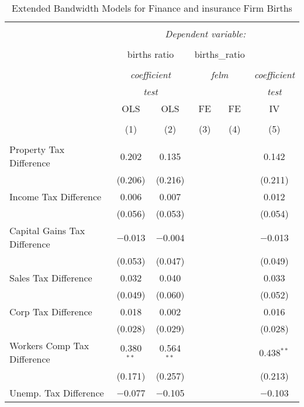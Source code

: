 
\begin{table}[!htbp] \centering 
  \caption{Extended Bandwidth Models for  Finance and insurance Firm Births} 
  \label{} 
\begin{tabular}{@{\extracolsep{5pt}}lccccc} 
\\[-1.8ex]\hline 
\hline \\[-1.8ex] 
 & \multicolumn{5}{c}{\textit{Dependent variable:}} \\ 
\cline{2-6} 
\\[-1.8ex] & \multicolumn{2}{c}{births ratio} & \multicolumn{2}{c}{births\_ratio} &   \\ 
\\[-1.8ex] & \multicolumn{2}{c}{\textit{coefficient}} & \multicolumn{2}{c}{\textit{felm}} & \textit{coefficient} \\ 
 & \multicolumn{2}{c}{\textit{test}} & \multicolumn{2}{c}{\textit{}} & \textit{test} \\ 
 & OLS & OLS & FE & FE & IV \\ 
\\[-1.8ex] & (1) & (2) & (3) & (4) & (5)\\ 
\hline \\[-1.8ex] 
 Property Tax Difference & 0.202 & 0.135 &  &  & 0.142 \\ 
  & (0.206) & (0.216) &  &  & (0.211) \\ 
  Income Tax Difference & 0.006 & 0.007 &  &  & 0.012 \\ 
  & (0.056) & (0.053) &  &  & (0.054) \\ 
  Capital Gains Tax Difference & $-$0.013 & $-$0.004 &  &  & $-$0.013 \\ 
  & (0.053) & (0.047) &  &  & (0.049) \\ 
  Sales Tax Difference & 0.032 & 0.040 &  &  & 0.033 \\ 
  & (0.049) & (0.060) &  &  & (0.052) \\ 
  Corp Tax Difference & 0.018 & 0.002 &  &  & 0.016 \\ 
  & (0.028) & (0.029) &  &  & (0.028) \\ 
  Workers Comp Tax Difference & 0.380$^{**}$ & 0.564$^{**}$ &  &  & 0.438$^{**}$ \\ 
  & (0.171) & (0.257) &  &  & (0.213) \\ 
  Unemp. Tax Difference & $-$0.077 & $-$0.105 &  &  & $-$0.103 \\ 

\end{tabular}
\end{table}
